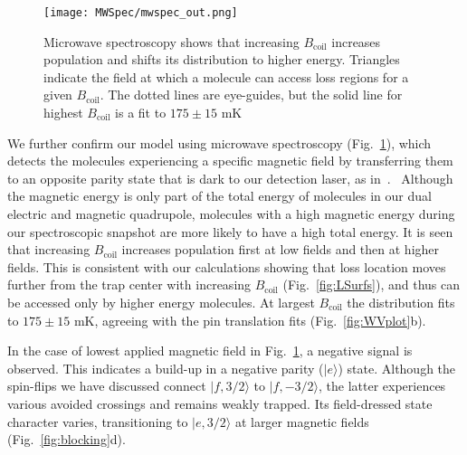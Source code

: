 \documentclass[%
 reprint,
 amsmath,amssymb,
 aps,
prl,
]{revtex4-1}
\newcommand{\bcl}{{$B_\text{coil}$}}
\newcommand{\cmnt}[1]{\ignorespaces}
\begin{document}
\begin{figure}[tb]
\texttt{[image: MWSpec/mwspec\_out.png]}%
\caption{
Microwave spectroscopy shows that increasing \bcl{} increases population and shifts its distribution to higher energy. Triangles indicate the field at which a molecule can access loss regions for a given \bcl. The dotted lines are eye-guides, but the solid line for highest \bcl{} is a fit to $175\pm15\text{ mK}$
\label{fig:spec}}
\end{figure}

We further confirm our model using microwave spectroscopy (Fig.~\ref{fig:spec}), which detects the molecules experiencing a specific magnetic field by transferring them to an opposite parity state that is dark to our detection laser, as in~\cite{Stuhl2012evap}.\cmnt{, except here we turn off the electric trapping field just before the spectroscopy, which happens before any significant molecular motion. \cmnt{but with a microwave probe directly exciting free space modes of our vacuum chamber\cmnt{instead of a bias tee}.}}  ~Although the magnetic energy is only part of the total energy of molecules in our dual electric and magnetic quadrupole, molecules with a high magnetic energy during our spectroscopic snapshot are more likely to have a high total energy. It is seen that increasing \bcl{} increases population first at low fields and then at higher fields. This is consistent with our calculations showing that loss location moves further from the trap center with increasing \bcl{} (Fig.~\ref{fig:LSurfs}), and thus can be accessed only by higher energy molecules. At largest \bcl{} the distribution fits to $175\pm15\text{ mK}$, agreeing with the pin translation fits (Fig.~\ref{fig:WVplot}b).%


In the case of lowest applied magnetic field in Fig.~\ref{fig:spec}, a negative signal is observed. This indicates a build-up in a negative parity ($|e\rangle$) state. Although the spin-flips we have discussed connect $|f,3/2\rangle$ to $|f,-3/2\rangle$, the latter experiences various avoided crossings and remains weakly trapped.  Its field-dressed state character varies, transitioning to $|e,3/2\rangle$ at larger magnetic fields (Fig.~\ref{fig:blocking}d). %
\end{document}
